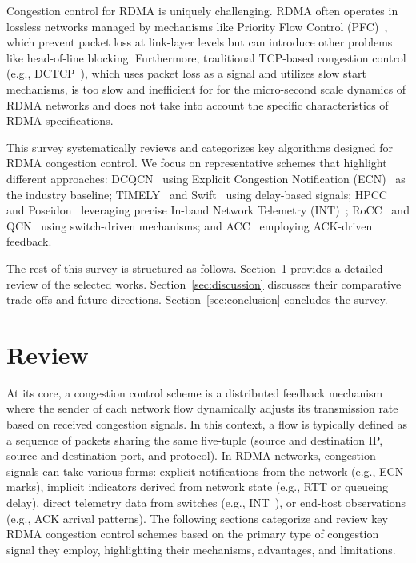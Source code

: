 \documentclass[11pt,en]{elegantpaper}
\begin{document}
Congestion control for RDMA is uniquely challenging. RDMA often operates in lossless networks managed by mechanisms like Priority Flow Control (PFC)~\cite{pfc-qbb}, which prevent packet loss at link-layer levels but can introduce other problems like head-of-line blocking. Furthermore, traditional TCP-based congestion control (e.g., DCTCP~\cite{dctcp}), which uses packet loss as a signal and utilizes slow start mechanisms, is too slow and inefficient for for the micro-second scale dynamics of RDMA networks and does not take into account the specific characteristics of RDMA specifications.

This survey systematically reviews and categorizes key algorithms designed for RDMA congestion control. We focus on representative schemes that highlight different approaches: DCQCN~\cite{dcqcn} using Explicit Congestion Notification (ECN)~\cite{ecn} as the industry baseline; TIMELY~\cite{timely} and Swift~\cite{swift} using delay-based signals; HPCC~\cite{hpcc} and Poseidon~\cite{poseidon} leveraging precise In-band Network Telemetry (INT)~\cite{int}; RoCC~\cite{rocc} and QCN~\cite{qcn} using switch-driven mechanisms; and ACC~\cite{acc} employing ACK-driven feedback.

The rest of this survey is structured as follows. Section~\ref{sec:review} provides a detailed review of the selected works. Section~\ref{sec:discussion} discusses their comparative trade-offs and future directions. Section~\ref{sec:conclusion} concludes the survey.


\section{Review}
\label{sec:review}

At its core, a congestion control scheme is a distributed feedback mechanism where the sender of each
network flow dynamically adjusts its transmission rate based on received congestion signals. In this context,
a flow is typically defined as a sequence of packets sharing the same five-tuple (source and destination IP,
source and destination port, and protocol). In RDMA networks, congestion signals can take various forms: explicit notifications from the network (e.g., ECN~\cite{ecn} marks), implicit indicators derived from network state (e.g., RTT or queueing delay), direct telemetry data from switches (e.g., INT~\cite{int}), or end-host observations (e.g., ACK arrival patterns). The following sections categorize and review key RDMA congestion control schemes based on the primary type of congestion signal they employ, highlighting their mechanisms, advantages, and limitations.
\end{document}
